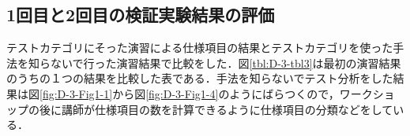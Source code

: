 \documentclass[a4paper,11pt]{jreport}
\begin{document}
\subsection{1回目と2回目の検証実験結果の評価}
テストカテゴリにそった演習による仕様項目の結果とテストカテゴリを使った手法を知らないで行った演習結果で比較をした．図\ref{tbl:D-3-tbl3}は最初の演習結果のうちの１つの結果を比較した表である．手法を知らないでテスト分析をした結果は図\ref{fig:D-3-Fig1-1}から図\ref{fig:D-3-Fig1-4}のようにばらつくので，ワークショップの後に講師が仕様項目の数を計算できるように仕様項目の分類などをしている．
\end{document}
